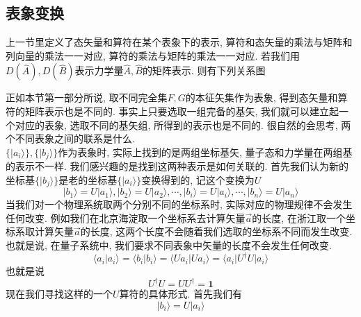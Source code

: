 \documentclass[a4paper,11pt]{book}
\newcommand{\A}{\hat{A}}
\newcommand{\B}{\hat{B}}
\begin{document}
\subsection{表象变换}
上一节里定义了态矢量和算符在某个表象下的表示, 算符和态矢量的乘法与矩阵和列向量的乘法一一对应, 算符的乘法与矩阵的乘法一一对应. 若我们用$D(\A),D(\B)$表示力学量$\A,\B$的矩阵表示. 则有下列关系图
\begin{center}
\end{center}
正如本节第一部分所说, 取不同完全集$F,G$的本征矢集作为表象, 得到态矢量和算符的矩阵表示也是不同的. 事实上只要选取一组完备的基矢, 我们就可以建立起一个对应的表象, 选取不同的基矢组, 所得到的表示也是不同的. 很自然的会思考, 两个不同表象之间的联系是什么. \\
$\{|a_i\rangle\},\{|b_j\rangle\}$作为表象时, 实际上找到的是两组坐标基矢, 量子态和力学量在两组基的表示不一样. 我们感兴趣的是找到这两种表示是如何关联的. 首先我们认为新的坐标基$\{|b_j\rangle\}$是老的坐标基$\{|a_i\rangle\}$变换得到的, 记这个变换为$U$
\begin{equation*}
  |b_1\rangle=U|a_1\rangle,|b_2\rangle=U|a_2\rangle,\cdots,|b_i\rangle=U|a_i\rangle,\cdots,|b_n\rangle=U|a_n\rangle
\end{equation*}
当我们对一个物理系统取两个分别不同的坐标系时, 实际对应的物理规律不会发生任何改变. 例如我们在北京海淀取一个坐标系去计算矢量$\vec{a}$的长度, 在浙江取一个坐标系取计算矢量$\vec{a}$的长度, 这两个长度不会随着我们选取的坐标系不同而发生改变. 也就是说, 在量子系统中, 我们要求不同表象中矢量的长度不会发生任何改变.
\begin{equation*}
  \langle a_i|a_i\rangle=\langle b_i|b_i\rangle=\langle Ua_i|Ua_i\rangle=\langle a_i|U^\dag U|a_i\rangle
\end{equation*}
也就是说
\begin{equation*}
  U^\dag U=UU^\dag=\mathbf{1}
\end{equation*}
现在我们寻找这样的一个$U$算符的具体形式. 首先我们有
\begin{equation}\label{ab rep}
  |b_i\rangle=U|a_i\rangle
\end{equation}
\end{document}
